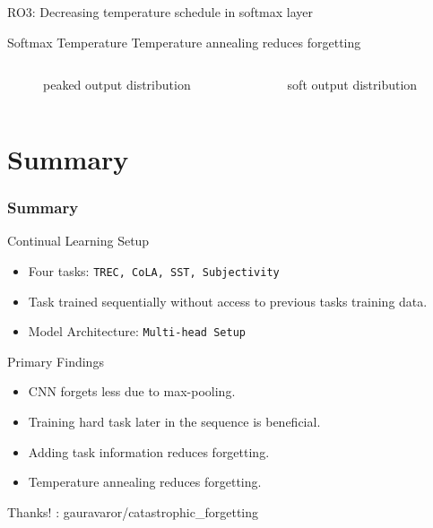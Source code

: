 \documentclass[aspectratio=169]{beamer}
\begin{document}
	\begin{frame}{RO3: Decreasing temperature schedule in softmax layer}
	    \begin{block}{Softmax Temperature}
		Temperature annealing reduces forgetting
	    \end{block}\pause
	    \begin{columns}
		\begin{column}{0.5\textwidth}
		\begin{figure}[h]
		    
		    \caption{peaked output distribution}
		\end{figure}
		\end{column}
		\begin{column}{0.5\textwidth}  %
		\begin{figure}[h]
		   \resizebox{10cm}{14cm}{
		   }
		    \caption{soft output distribution}
		\end{figure}
		\end{column}
		\end{columns}
	 \end{frame}
\section{Summary}
	\begin{frame}
	    \frametitle{Summary}
		\begin{block}{Continual Learning Setup}
		    \begin{itemize}
			\item Four tasks: \texttt{TREC, CoLA, SST, Subjectivity}
			\item Task trained sequentially without access to previous tasks training data.
			\item Model Architecture: \texttt{Multi-head Setup}
		    \end{itemize}
		\end{block}
		\begin{block}{Primary Findings}
		    \begin{itemize}
			\item CNN forgets less due to max-pooling.
			\item Training hard task later in the sequence is beneficial.
			\item Adding task information reduces forgetting.
			\item Temperature annealing reduces forgetting.
		    \end{itemize}
		\end{block} \pause
		   Thanks! \hfill \faGithub: gauravaror/catastrophic\_forgetting
	\end{frame}
\end{document}
